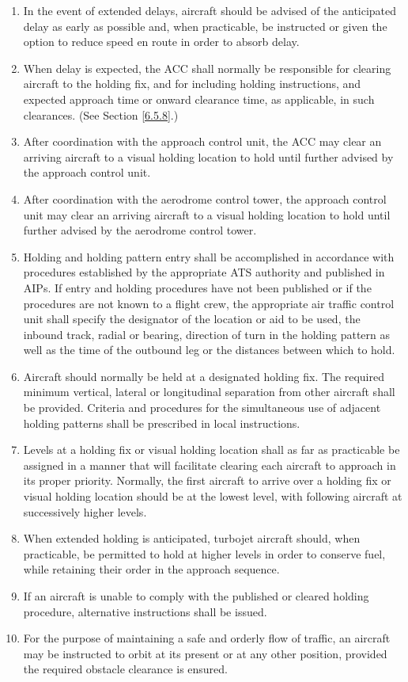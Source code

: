 \begin{enumerate}
    \item In the event of extended delays, aircraft should be advised of the anticipated delay as early as possible and, when practicable, be instructed or given the option to reduce speed en route in order to absorb delay.
    \item When delay is expected, the ACC shall normally be responsible for clearing aircraft to the holding fix, and for including holding instructions, and expected approach time or onward clearance time, as applicable, in such clearances. (See Section \ref{6.5.8}.)
    \item After coordination with the approach control unit, the ACC may clear an arriving aircraft to a visual holding location to hold until further advised by the approach control unit.
    \item After coordination with the aerodrome control tower, the approach control unit may clear an arriving aircraft to a visual holding location to hold until further advised by the aerodrome control tower.
    \item Holding and holding pattern entry shall be accomplished in accordance with procedures established by the appropriate ATS authority and published in AIPs. If entry and holding procedures have not been published or if the procedures are not known to a flight crew, the appropriate air traffic control unit shall specify the designator of the location or aid to be used, the inbound track, radial or bearing, direction of turn in the holding pattern as well as the time of the outbound leg or the distances between which to hold.
    \item Aircraft should normally be held at a designated holding fix. The required minimum vertical, lateral or longitudinal separation from other aircraft shall be provided. Criteria and procedures for the simultaneous use of adjacent holding patterns shall be prescribed in local instructions.
    \item Levels at a holding fix or visual holding location shall as far as practicable be assigned in a manner that will facilitate clearing each aircraft to approach in its proper priority. Normally, the first aircraft to arrive over a holding fix or visual holding location should be at the lowest level, with following aircraft at successively higher levels.
    \item When extended holding is anticipated, turbojet aircraft should, when practicable, be permitted to hold at higher levels in order to conserve fuel, while retaining their order in the approach sequence.
    \item If an aircraft is unable to comply with the published or cleared holding procedure, alternative instructions shall be issued.
    \item For the purpose of maintaining a safe and orderly flow of traffic, an aircraft may be instructed to orbit at its present or at any other position, provided the required obstacle clearance is ensured.
\end{enumerate}

